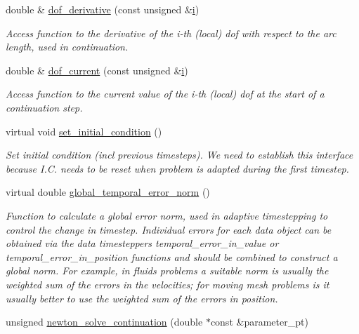 \begin{DoxyCompactItemize}
double \& \hyperlink{classoomph_1_1Problem_ad6df5fb0d282f25df1e94a665dd838e5}{dof\+\_\+derivative} (const unsigned \&\hyperlink{cfortran_8h_adb50e893b86b3e55e751a42eab3cba82}{i})
\begin{DoxyCompactList}\small\item\em Access function to the derivative of the i-\/th (local) dof with respect to the arc length, used in continuation. \end{DoxyCompactList}\item 
double \& \hyperlink{classoomph_1_1Problem_a10fd6457ceceb02a0e11d860ac0017c5}{dof\+\_\+current} (const unsigned \&\hyperlink{cfortran_8h_adb50e893b86b3e55e751a42eab3cba82}{i})
\begin{DoxyCompactList}\small\item\em Access function to the current value of the i-\/th (local) dof at the start of a continuation step. \end{DoxyCompactList}\item 
virtual void \hyperlink{classoomph_1_1Problem_ad48be6d67071f7da5f6feb7c4fc918f0}{set\+\_\+initial\+\_\+condition} ()
\begin{DoxyCompactList}\small\item\em Set initial condition (incl previous timesteps). We need to establish this interface because I.\+C. needs to be reset when problem is adapted during the first timestep. \end{DoxyCompactList}\item 
virtual double \hyperlink{classoomph_1_1Problem_ac7667864b71a3889c95c29307422ac8e}{global\+\_\+temporal\+\_\+error\+\_\+norm} ()
\begin{DoxyCompactList}\small\item\em Function to calculate a global error norm, used in adaptive timestepping to control the change in timestep. Individual errors for each data object can be obtained via the data timestepper\textquotesingle{}s temporal\+\_\+error\+\_\+in\+\_\+value or temporal\+\_\+error\+\_\+in\+\_\+position functions and should be combined to construct a global norm. For example, in fluids problems a suitable norm is usually the weighted sum of the errors in the velocities; for moving mesh problems is it usually better to use the weighted sum of the errors in position. \end{DoxyCompactList}\item 
unsigned \hyperlink{classoomph_1_1Problem_aea0efdeb4814de433fa2ffb3065831ce}{newton\+\_\+solve\+\_\+continuation} (double $\ast$const \&parameter\+\_\+pt)

\end{DoxyCompactItemize}
